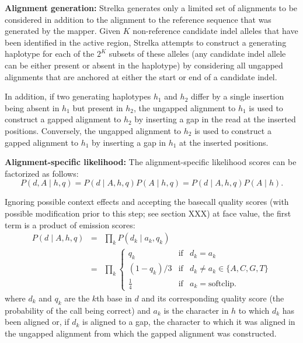 \documentclass{article}
\begin{document}
{\bf Alignment generation:}
Strelka generates only a limited set of alignments to be considered in addition to the alignment to the reference sequence that was generated by the mapper. Given $K$ non-reference candidate indel alleles that have been identified in the active region, Strelka attempts to construct a generating haplotype for each of the $2^K$ subsets of these alleles (any candidate indel allele can be either present or absent in the haplotype) by considering all ungapped alignments that are anchored at either the start or end of a candidate indel.

In addition, if two generating haplotypes $h_1$ and $h_2$ differ by a single insertion being absent in $h_1$ but present in $h_2$, the ungapped alignment to $h_1$ is used to construct a gapped alignment to $h_2$ by inserting a gap in the read at the inserted positions. Conversely, the ungapped alignment to $h_2$ is used to construct a gapped alignment to $h_1$ by inserting a gap in $h_1$ at the inserted positions.

{\bf Alignment-specific likelihood:}
The alignment-specific likelihood scores can be factorized as follows:
\begin{equation*}
\label{eq:al_lik}
P(d,A \mid h,q) = P(d \mid A,h,q)P(A \mid h,q) = P(d \mid A,h,q)P(A \mid h).
\end{equation*}

Ignoring possible context effects and accepting the basecall quality scores (with possible modification prior to this step; see section XXX) at face value, the first term is a product of emission scores:
\begin{eqnarray*}
P(d \mid A,h,q) & = & \prod_k P(d_k \mid a_k,q_k)\\
& = & \prod_k \left\{
                        \begin{array}{lcl}
                             q_k & \mathrm{if} & d_k=a_k\\
                             (1-q_k)/3 & \mathrm{if} &  d_k \neq a_k \in \{A,C,G,T\}\\
                             \frac{1}{4} & \mathrm{if} & a_k=\mathrm{softclip}.
                        \end{array}
                      \right.
\end{eqnarray*}
where $d_k$ and $q_k$ are the $k$th base in $d$ and its corresponding quality score (the probability of the call being correct) and $a_k$ is the character in $h$ to which $d_k$ has been aligned or, if $d_k$ is aligned to a gap, the character to which it was aligned in the ungapped alignment from which the gapped alignment was constructed.
\end{document}
